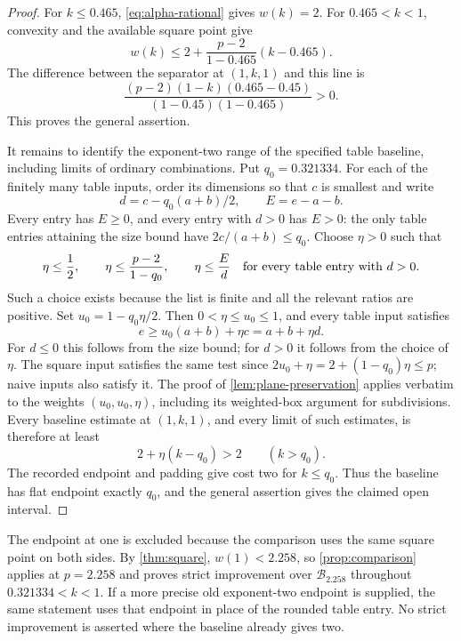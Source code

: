 \begin{proof}
For \(k\le0.465\), \eqref{eq:alpha-rational} gives \(w(k)=2\).
For \(0.465<k<1\), convexity and the available square point give
\[
 w(k)\le 2+\frac{p-2}{1-0.465}(k-0.465).
\]
The difference between the separator at \((1,k,1)\) and this line is
\begin{equation}\label{eq:positive-gap}
 \frac{(p-2)(1-k)(0.465-0.45)}
 {(1-0.45)(1-0.465)}>0.
\end{equation}
This proves the general assertion.

It remains to identify the exponent-two range of the specified table
baseline, including limits of ordinary combinations.
Put \(q_0=0.321334\).
For each of the finitely many table inputs, order its dimensions so
that \(c\) is smallest and write
\[
 d=c-q_0(a+b)/2,\qquad E=e-a-b.
\]
Every entry has \(E\ge0\), and every entry with \(d>0\) has
\(E>0\): the only table entries attaining the size bound have
\(2c/(a+b)\le q_0\).
Choose \(\eta>0\) such that
\[
 \eta\le\frac12,\qquad
 \eta\le\frac{p-2}{1-q_0},\qquad
 \eta\le\frac{E}{d}\quad\hbox{for every table entry with }d>0.
\]
Such a choice exists because the list is finite and all the relevant
ratios are positive.
Set \(u_0=1-q_0\eta/2\).
Then \(0<\eta\le u_0\le1\), and every table input satisfies
\[
 e\ge u_0(a+b)+\eta c=a+b+\eta d.
\]
For \(d\le0\) this follows from the size bound; for \(d>0\) it
follows from the choice of \(\eta\).
The square input satisfies the same test since
\(2u_0+\eta=2+(1-q_0)\eta\le p\); naive inputs also satisfy it.
The proof of \cref{lem:plane-preservation} applies verbatim to the
weights \((u_0,u_0,\eta)\), including its weighted-box argument for
subdivisions.
Every baseline estimate at \((1,k,1)\), and every limit of such
estimates, is therefore at least
\[
 2+\eta(k-q_0)>2\qquad(k>q_0).
\]
The recorded endpoint and padding give cost two for \(k\le q_0\).
Thus the baseline has flat endpoint exactly \(q_0\), and the general
assertion gives the claimed open interval.
\end{proof}

The endpoint at one is excluded because the comparison uses the same
square point on both sides.
By \cref{thm:square}, \(w(1)<2.258\), so
\cref{prop:comparison} applies at \(p=2.258\) and proves strict
improvement over \(\mathcal B_{2.258}\) throughout
\(0.321334<k<1\).
If a more precise old exponent-two endpoint is supplied, the same
statement uses that endpoint in place of the rounded table entry.
No strict improvement is asserted where the baseline already gives two.

